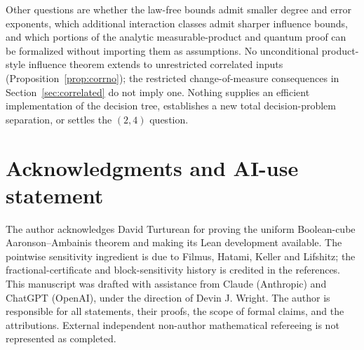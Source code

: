 \documentclass[11pt]{article}
\numberwithin{equation}{section}
\theoremstyle{remark}
\begin{document}
Other questions are whether the law-free bounds admit smaller degree and error exponents, which additional interaction classes admit sharper influence bounds, and which portions of the analytic measurable-product and quantum proof can be formalized without importing them as assumptions. No unconditional product-style influence theorem extends to unrestricted correlated inputs (Proposition~\ref{prop:corrno}); the restricted change-of-measure consequences in Section~\ref{sec:correlated} do not imply one. Nothing supplies an efficient implementation of the decision tree, establishes a new total decision-problem separation, or settles the $(2,4)$ question.

\section*{Acknowledgments and AI-use statement}
The author acknowledges David Turturean for proving the uniform Boolean-cube Aaronson--Ambainis theorem and making its Lean development available. The pointwise sensitivity ingredient is due to Filmus, Hatami, Keller and Lifshitz; the fractional-certificate and block-sensitivity history is credited in the references. This manuscript was drafted with assistance from Claude (Anthropic) and ChatGPT (OpenAI), under the direction of Devin J. Wright. The author is responsible for all statements, their proofs, the scope of formal claims, and the attributions. External independent non-author mathematical refereeing is not represented as completed.

\appendix
\end{document}

